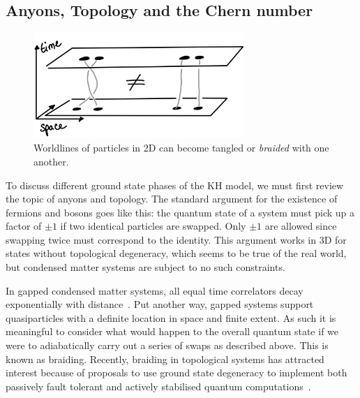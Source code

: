 \hypertarget{sec:anyons}{%
\subsection{Anyons, Topology and the Chern number}\label{sec:anyons}}

\hypertarget{fig:braiding}{%
\begin{figure}
\centering
\includegraphics[width=0.71\textwidth,height=\textheight]{figure_code/amk_chapter/braiding.png}
\caption[{Braiding in Two Dimensions}]{Worldlines of particles in 2D can become tangled or \emph{braided} with one another.}
\label{fig:braiding}
\end{figure}
}

To discuss different ground state phases of the KH model, we must first review the topic of anyons and topology. The standard argument for the existence of fermions and bosons goes like this: the quantum state of a system must pick up a factor of \(\pm1\) if two identical particles are swapped. Only \(\pm1\) are allowed since swapping twice must correspond to the identity. This argument works in 3D for states without topological degeneracy, which seems to be true of the real world, but condensed matter systems are subject to no such constraints.

In gapped condensed matter systems, all equal time correlators decay exponentially with distance~\autocite{hastingsLiebSchultzMattisHigherDimensions2004}. Put another way, gapped systems support quasiparticles with a definite location in space and finite extent. As such it is meaningful to consider what would happen to the overall quantum state if we were to adiabatically carry out a series of swaps as described above. This is known as braiding. Recently, braiding in topological systems has attracted interest because of proposals to use ground state degeneracy to implement both passively fault tolerant and actively stabilised quantum computations~\autocite{kitaev_fault-tolerant_2003,poulinStabilizerFormalismOperator2005,hastingsDynamicallyGeneratedLogical2021}.

